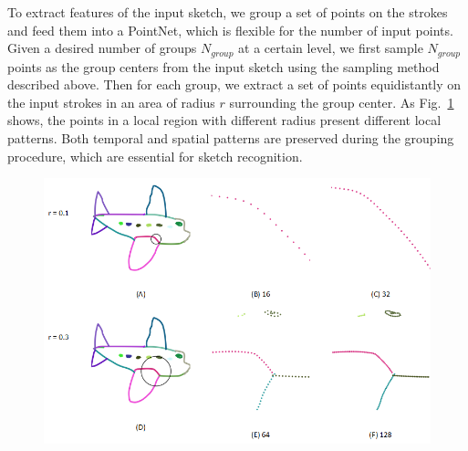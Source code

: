 
To extract features of the input sketch, we group a set of points on the strokes and feed them into a PointNet, which is flexible for the number of input points.  
%
Given a desired number of groups $N_{group}$ at a certain level, we first sample $N_{group}$ points as the group centers from the input sketch using the sampling method described above.
%
Then for each group, we extract a set of points equidistantly on the input strokes in an area of radius $r$ surrounding the group center.
%
%
As Fig.~\ref{fig:group} shows, the points in a local region with different radius present different local patterns. 
%
Both temporal and spatial patterns are preserved during the grouping procedure, which are essential for sketch recognition.
\\



\begin{figure}
	\centering
	\includegraphics[width=\columnwidth]{images/group.png}
	\label{fig:group}
\end{figure}

